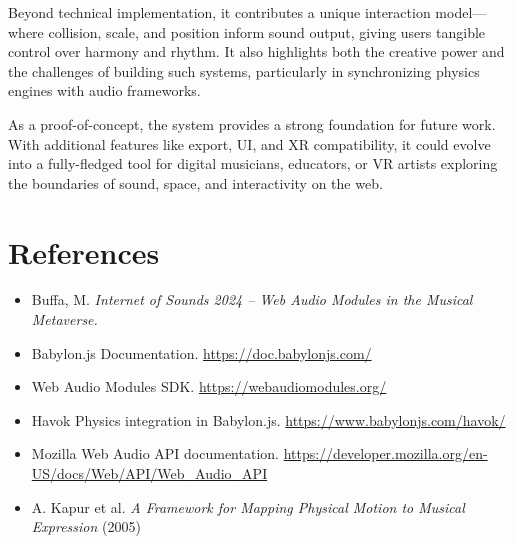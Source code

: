 \documentclass[a4paper,11pt]{article}
\begin{document}
Beyond technical implementation, it contributes a unique interaction model—where collision, scale, and position inform sound output, giving users tangible control over harmony and rhythm. It also highlights both the creative power and the challenges of building such systems, particularly in synchronizing physics engines with audio frameworks.

As a proof-of-concept, the system provides a strong foundation for future work. With additional features like export, UI, and XR compatibility, it could evolve into a fully-fledged tool for digital musicians, educators, or VR artists exploring the boundaries of sound, space, and interactivity on the web.


\newpage
\section*{References}
\begin{itemize}
    \item Buffa, M. \textit{Internet of Sounds 2024 – Web Audio Modules in the Musical Metaverse.}
    \item Babylon.js Documentation. \url{https://doc.babylonjs.com/}
    \item Web Audio Modules SDK. \url{https://webaudiomodules.org/}
    \item Havok Physics integration in Babylon.js. \url{https://www.babylonjs.com/havok/}
    \item Mozilla Web Audio API documentation. \url{https://developer.mozilla.org/en-US/docs/Web/API/Web_Audio_API}
    \item A. Kapur et al. \textit{A Framework for Mapping Physical Motion to Musical Expression} (2005)
\end{itemize}
\end{document}
